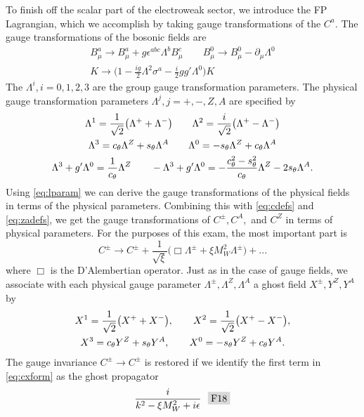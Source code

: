 To finish off the scalar part of the electroweak sector, we introduce the FP
Lagrangian, which we accomplish by taking gauge transformations of the $C^a$.
The gauge transformations of the bosonic fields are
\begin{gather}
  B_\mu^a\to B_\mu^a+g\epsilon^{abc}\Lambda^bB^c_\mu \qquad
  B^0_\mu\to B^0_\mu-\partial_\mu\Lambda^0 \\
  K\to \Bigg(1-\frac{ig}{2}\Lambda^2\sigma^a-\frac{i}{2}gg'\Lambda^0\Bigg)K
\end{gather}
The $\Lambda^i,i=0,1,2,3$ are the group gauge transformation parameters. The
physical gauge transformation parameters $\Lambda^j,j=+,-,Z,A$ are
specified by
\begin{gather}
  \label{eq:lparam}
  \Lambda^1=\frac{1}{\sqrt{2}}\big(\Lambda^++\Lambda^-\big) \qquad
  \Lambda^2=\frac{i}{\sqrt{2}}\big(\Lambda^+-\Lambda^-\big) \\
  \nonumber
  \Lambda^3=c_{\theta}\Lambda^Z+s_{\theta}\Lambda^A \qquad
  \Lambda^0=-s_{\theta}\Lambda^Z+c_{\theta}\Lambda^A \\
  \nonumber
  \Lambda^3+g'\Lambda^0=\frac{1}{c_{\theta}}\Lambda^Z \qquad
  -\Lambda^3+g'\Lambda^0=-\frac{c_{\theta}^2-s_{\theta}^2}{c_{\theta}}\Lambda^Z-2s_{\theta}\Lambda^A.
\end{gather}
Using \eqref{eq:lparam} we can derive the gauge transformations of the
physical fields in terms of the physical parameters. Combining this with
\eqref{eq:cdefs} and \eqref{eq:zadefs}, we get the gauge transformations of
$C^\pm,C^A,$ and $C^Z$ in terms of physical parameters. For the purposes
of this exam, the most important part is
\begin{equation}
  \label{eq:cxform}
  C^\pm \to C^\pm +\frac{1}{\sqrt{\xi}}\big(\Box\Lambda^\pm
                         +\xi M_W^2 \Lambda^\pm\big)+...
\end{equation}
where $\Box$ is the D'Alembertian operator. Just as in the case of gauge
fields, we associate with each physical gauge parameter
$\Lambda^\pm,\Lambda^Z,\Lambda^A$ a ghost field $X^\pm,Y^Z,Y^A$ by
\begin{gather}
  X^1=\frac{1}{\sqrt{2}}\big(X^++X^-\big), \qquad
  X^2=\frac{1}{\sqrt{2}}\big(X^+-X^-\big), \\
  X^3=c_{\theta} Y^Z+s_{\theta} Y^A, \qquad
  X^0=-s_{\theta} Y^Z +c_{\theta} Y^A. \nonumber
\end{gather}
The gauge
invariance $C^\pm\to C^\pm$ is restored if we identify the first term in
\eqref{eq:cxform} as the ghost propagator
\begin{gather*}
  \frac{i}{k^2-\xi M_W^2+i\epsilon}~~\F{18}
\end{gather*}
